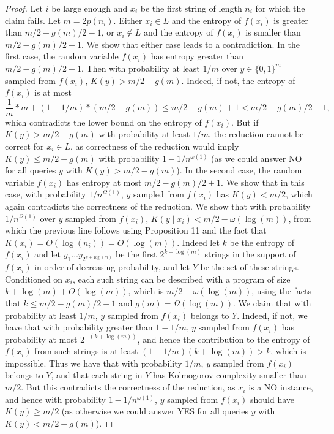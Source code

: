 \begin{proof}
Let $i$ be large enough and $x_i$ be the first string of length $n_i$ for which the claim fails. Let $m=2p(n_i)$. Either $x_i\in L$ and the entropy of $f(x_i)$ is greater than $m/2-g(m)/2-1$, or $x_i\notin L$ and the entropy of $f(x_i)$ is smaller than $m/2-g(m)/2+1$. We show that either case leads to a contradiction.
In the first case, the random variable $f(x_i)$ has entropy greater than $m/2-g(m)/2-1$. Then with probability at least $1/m$ over $y\in\{0,1\}^m$ sampled from $f(x_i)$, $K(y)>m/2-g(m)$. Indeed, if not, the entropy of $f(x_i)$ is at most
\[\frac1m*m+(1-1/m)*(m/2-g(m))\leq m/2-g(m)+1<m/2-g(m)/2-1,\]
which contradicts the lower bound on the entropy of $f(x_i)$. But if $K(y)>m/2-g(m)$ with probability at least $1/m$, the reduction cannot be correct for $x_i\in L$, as correctness of the reduction would imply $K(y)\leq m/2-g(m)$ with probability $1-1/n^{\omega(1)}$ (as we could answer NO for all queries $y$ with $K(y)>m/2-g(m)$).
In the second case, the random variable $f(x_i)$ has entropy at most $m/2-g(m)/2+1$. We show that in this case, with probability $1/n^{\Omega(1)}$, $y$ sampled from $f(x_i)$ has $K(y)<m/2$, which again contradicts the correctness of the reduction.
We show that with probability $1/n^{\Omega(1)}$ over $y$ sampled from $f(x_i)$, $K(y\mid x_i)<m/2-\omega(\log(m))$, from which the previous line follows using Proposition 11 and the fact that $K(x_i)=O(\log(n_i))=O(\log(m))$. Indeed let $k$ be the entropy of $f(x_i)$ and let $y_1\ldots y_{2^{k+\log(m)}}$ be the first $2^{k+\log(m)}$ strings in the support of $f(x_i)$ in order of decreasing probability, and let $Y$ be the set of these strings. Conditioned on $x_i$, each such string can be described with a program of size $k+\log(m)+O(\log(m))$, which is $m/2-\omega(\log(m))$, using the facts that $k\leq m/2-g(m)/2+1$ and $g(m)=\Omega(\log(m))$. We claim that with probability at least $1/m$, $y$ sampled from $f(x_i)$ belongs to $Y$. Indeed, if not, we have that with probability greater than $1-1/m$, $y$ sampled from $f(x_i)$ has probability at most $2^{-(k+\log(m))}$, and hence the contribution to the entropy of $f(x_i)$ from such strings is at least $(1-1/m)(k+\log(m))>k$, which is impossible.
Thus we have that with probability $1/m$, $y$ sampled from $f(x_i)$ belongs to $Y$, and that each string in $Y$ has Kolmogorov complexity smaller than $m/2$. But this contradicts the correctness of the reduction, as $x_i$ is a NO instance, and hence with probability $1-1/n^{\omega(1)}$, $y$ sampled from $f(x_i)$ should have $K(y)\geq m/2$ (as otherwise we could answer YES for all queries $y$ with $K(y)<m/2-g(m)$).
\end{proof}

